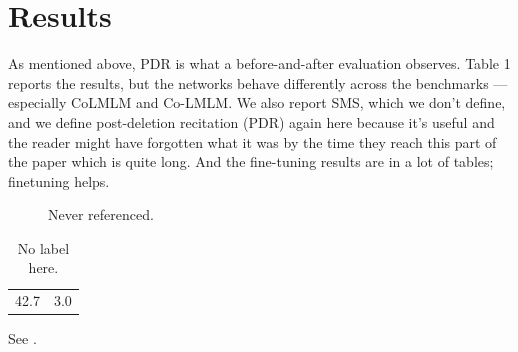 \section{Results}
As mentioned above, PDR is what a before-and-after evaluation observes. Table 1 reports the results, but the networks behave differently across the benchmarks — especially CoLMLM and Co-LMLM. We also report SMS, which we don't define, and we define post-deletion recitation (PDR) again here because it's useful and the reader might have forgotten what it was by the time they reach this part of the paper which is quite long.
And the fine-tuning results are in a lot of tables; finetuning helps.
\begin{figure}
\centering
\caption{Never referenced.}
\label{fig:unused}
\end{figure}
\begin{table}
\caption{No label here.}
\begin{tabular}{cc} 42.7 & 3.0 \\ \end{tabular}
\end{table}
See .
